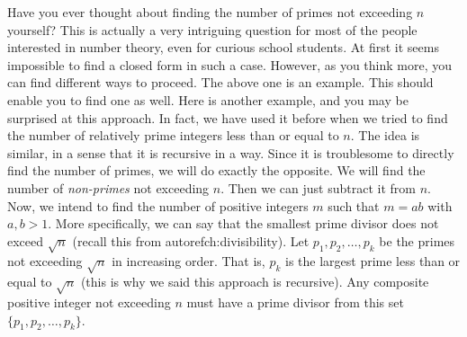 \documentclass{subfiles}
\begin{document}
		Have you ever thought about finding the number of primes not exceeding $n$ yourself? This is actually a very intriguing question for most of the people interested in number theory, even for curious school students. At first it seems impossible to find a closed form in such a case. However, as you think more, you can find different ways to proceed. The above one is an example. This should enable you to find one as well. Here is another example, and you may be surprised at this approach. In fact, we have used it before when we tried to find the number of relatively prime integers less than or equal to $n$. The idea is similar, in a sense that it is recursive in a way. Since it is troublesome to directly find the number of primes, we will do exactly the opposite. We will find the number of \textit{non-primes} not exceeding $n$. Then we can just subtract it from $n$. Now, we intend to find the number of positive integers $m$ such that $m=ab$ with $a,b>1$. More specifically, we can say that the smallest prime divisor does not exceed $\sqrt{n}$ (recall this from autoref{ch:divisibility}). Let $p_1,p_2,\ldots,p_k$ be the primes not exceeding $\sqrt{n}$ in increasing order. That is, $p_k$ is the largest prime less than or equal to $\sqrt{n}$ (this is why we said this approach is recursive). Any composite positive integer not exceeding $n$ must have a prime divisor from this set $\{p_1,p_2,\ldots,p_k\}$.
\end{document}
